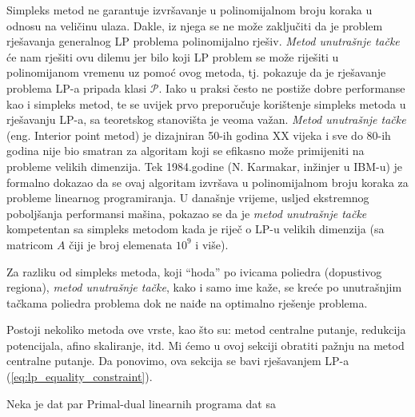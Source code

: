 \documentclass[a4paper, utf8, 11pt, colorlinks]{article}
\begin{document}
Simpleks metod ne garantuje   izvršavanje u polinomijalnom broju koraka u odnosu na veličinu ulaza. %
Dakle, iz njega se ne može zaključiti da je problem rješavanja generalnog LP problema   polinomijalno rješiv. \emph{Metod unutrašnje tačke} će nam  rješiti ovu dilemu jer bilo koji LP problem se može riješiti u polinomijanom vremenu uz pomoć ovog metoda, tj. pokazuje da je rješavanje problema LP-a pripada klasi $\mathcal{P}$. Iako u praksi često ne postiže dobre  performanse kao i simpleks metod, te se uvijek prvo preporučuje korištenje simpleks metoda u rješavanju LP-a, sa teoretskog stanovišta je veoma važan.  \emph{Metod unutrašnje tačke} (eng. Interior point metod) je dizajniran 50-ih godina XX vijeka i sve do 80-ih godina nije bio smatran za algoritam koji se efikasno može primijeniti na probleme velikih dimenzija. Tek 1984.godine (N. Karmakar, inžinjer u IBM-u) je formalno dokazao da se ovaj algoritam izvršava u polinomijalnom broju koraka za probleme linearnog programiranja. U današnje vrijeme, usljed ekstremnog poboljšanja performansi mašina, pokazao se da je \emph{metod unutrašnje tačke} kompetentan sa simpleks metodom kada je riječ o LP-u velikih dimenzija (sa matricom $A$ čiji je broj elemenata $10^9$ i više).

Za razliku od simpleks metoda, koji ``hoda'' po ivicama poliedra (dopustivog regiona), \emph{metod unutrašnje tačke}, kako i samo ime kaže, se kreće po unutrašnjim tačkama poliedra problema dok ne naiđe na optimalno rješenje problema. 

Postoji nekoliko metoda ove vrste, kao što su: metod centralne putanje, redukcija potencijala, afino skaliranje, itd. Mi ćemo u ovoj sekciji obratiti pažnju na metod centralne putanje. Da ponovimo, ova sekcija se bavi rješavanjem LP-a (\ref{eq:lp_equality_constraint}). 

Neka je dat par Primal-dual linearnih programa dat sa \\
\end{document}
